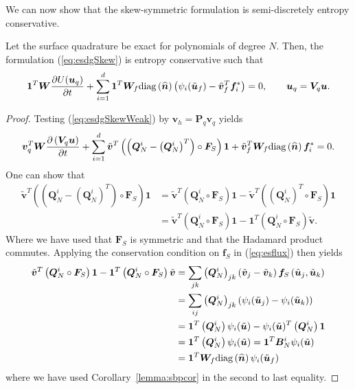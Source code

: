 \documentclass[review]{siamart0216}
\theoremstyle{assumption}
\renewcommand{\hat}[1]{\widehat{#1}}
\newcommand{\pd}[2]{\frac{\partial#1}{\partial#2}}
\newcommand{\LRp}[1]{\left( #1 \right)}
\newcommand{\diag}[1]{{\rm diag}\LRp{#1}}
\begin{document}
We can now show that the skew-symmetric formulation is semi-discretely entropy conservative.  
\begin{theorem}
Let the surface quadrature be exact for polynomials of degree $N$.  Then, the formulation (\ref{eq:esdgSkew}) is entropy conservative such that
\[
\bm{1}^T\bm{W}\pd{U(\bm{u}_q)}{t} + \sum_{i=1}^d\bm{1}^T\bm{W}_f \diag{\hat{\bm{n}}} \LRp{\psi_i(\tilde{\bm{u}}_f) - \tilde{\bm{v}}_f^T\bm{f}_i^*} = 0, \qquad \bm{u}_q = \bm{V}_q\bm{u}.
\]
\label{thm:esdg}
\end{theorem}
\begin{proof}
Testing (\ref{eq:esdgSkewWeak}) by $\bm{v}_h = \bm{P}_q\bm{v}_q$ yields 
\begin{align}
\bm{v}_q^T\bm{W}\pd{\LRp{\bm{V}_q\bm{u}}}{t} + \sum_{i=1}^d
\tilde{\bm{v}}^T \LRp{\LRp{\bm{Q}^i_N - \LRp{\bm{Q}^i_N}^T} \circ \bm{F}_S}\bm{1} + \tilde{\bm{v}}_f^T \bm{W}_f \diag{\hat{\bm{n}}}\bm{f}_i^* = 0.
\end{align}
One can show that \cite{chan2017discretely}
\begin{align*}
\tilde{\bm{v}}^T \LRp{\LRp{\bm{Q}^i_N - \LRp{\bm{Q}^i_N}^T} \circ \bm{F}_S}\bm{1} &= \tilde{\bm{v}}^T \LRp{\bm{Q}^i_N \circ \bm{F}_S}\bm{1} - \tilde{\bm{v}}^T \LRp{\LRp{\bm{Q}^i_N}^T \circ \bm{F}_S}\bm{1}\\
&= \tilde{\bm{v}}^T \LRp{\bm{Q}^i_N \circ \bm{F}_S}\bm{1} - \bm{1}^T \LRp{{\bm{Q}^i_N} \circ \bm{F}_S}\tilde{\bm{v}}.
\end{align*}
Where we have used that $\bm{F}_S$ is symmetric and that the Hadamard product commutes.  Applying the conservation condition on $\bm{f}_S$ in (\ref{eq:esflux}) then yields
\begin{align*}
\tilde{\bm{v}}^T \LRp{\bm{Q}^i_N \circ \bm{F}_S}\bm{1} - \bm{1}^T \LRp{{\bm{Q}^i_N} \circ \bm{F}_S}\tilde{\bm{v}} &= \sum_{jk} \LRp{\bm{Q}^i_N}_{jk} \LRp{\tilde{\bm{v}}_j-\tilde{\bm{v}}_k} \bm{f}_S\LRp{\tilde{\bm{u}}_j,\tilde{\bm{u}}_k} \\
&= \sum_{ij} \LRp{\bm{Q}^i_N}_{jk} \LRp{\psi_i(\tilde{\bm{u}}_j) - \psi_i(\tilde{\bm{u}}_k)}\\
&= \bm{1}^T\LRp{\bm{Q}^i_N}\psi_i(\tilde{\bm{u}}) - \psi_i(\tilde{\bm{u}})^T\LRp{\bm{Q}^i_N}\bm{1} \\
&= \bm{1}^T\LRp{\bm{Q}^i_N}\psi_i(\tilde{\bm{u}}) = \bm{1}^T\bm{B}^i_N\psi_i(\tilde{\bm{u}}) \\
&= \bm{1}^T\bm{W}_f \diag{\hat{\bm{n}}} \psi_i(\tilde{\bm{u}}_f)
\end{align*}
where we have used Corollary~\ref{lemma:sbpcor} in the second to last equality.
\end{proof}
\end{document}
